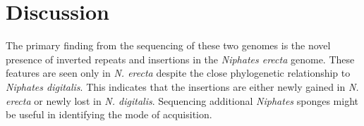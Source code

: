 \documentclass[../main.tex]{subfiles}
\begin{document}
\section{Discussion}
The primary finding from the sequencing of these two genomes is the novel presence of inverted repeats and insertions in the \emph{Niphates erecta} genome. These features are seen only in \emph{N. erecta} despite the close phylogenetic relationship to \emph{Niphates digitalis}. This indicates that the insertions are either newly gained in \emph{N. erecta} or newly lost in \emph{N. digitalis}. Sequencing additional \emph{Niphates} sponges might be useful in identifying the mode of acquisition.
\end{document}

